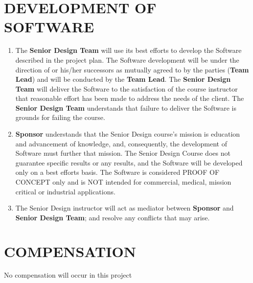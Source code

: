 \documentclass[11pt]{article}
\begin{document}
\section{DEVELOPMENT OF SOFTWARE }
\begin{enumerate}  \itemsep4pt \parskip0pt 
\item   The \textbf{Senior Design Team} will use its best efforts to develop the Software described in the project plan. The Software development will be under the direction of  or his/her successors as mutually agreed to by the parties (\textbf{Team Lead}) and will be conducted by the \textbf{Team Lead}.  The \textbf{Senior Design Team} will deliver the Software to the satisfaction of the course instructor that reasonable effort has been made to address the needs of the client.  The \textbf{Senior Design Team} understands that failure to deliver the Software is grounds for failing the course. 

\item  \textbf{Sponsor} understands that the Senior Design course's mission is education and advancement of knowledge, and, consequently, the development of Software must further that mission. The Senior Design Course does not guarantee specific results or any results, and the Software will be developed only on a best efforts basis.  The Software is considered PROOF OF CONCEPT only and is NOT intended for commercial, medical, mission critical or industrial applications.

\item  The Senior Design instructor will act as mediator between \textbf{Sponsor} and \textbf{Senior Design Team}; and resolve any conflicts that may arise.
\end{enumerate}

\section{COMPENSATION}

No compensation will occur in this project
\end{document}
